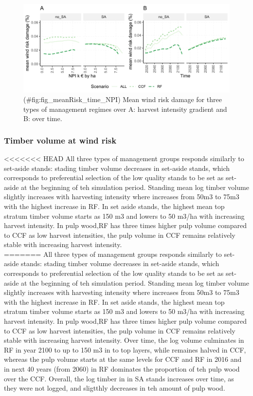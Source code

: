 \documentclass[]{elsarticle} %
\makeatletter
\def\maxwidth{\ifdim\Gin@nat@width>\linewidth\linewidth
\else\Gin@nat@width\fi}
\let\Oldincludegraphics\includegraphics
\renewcommand{\includegraphics}[1]{\Oldincludegraphics[width=\maxwidth]{#1}}
\makeatother
\begin{document}
\begin{figure}
\centering
\includegraphics{test_manus_files/figure-latex/fig_meanRisk_time_NPI-1.pdf}
\caption{(\#fig:fig\_meanRisk\_time\_NPI)\label{fig:fig_meanRisk_time_NPI} Mean wind risk damage for three types of management regimes over A: harvest intensity gradient and B: over time.}
\end{figure}

\hypertarget{timber-volume-at-wind-risk}{%
\subsubsection{Timber volume at wind risk}\label{timber-volume-at-wind-risk}}

\textless{}\textless{}\textless{}\textless{}\textless{}\textless{}\textless{} HEAD
All three types of management groups responds similarly to set-aside stands: stading timber volume decreases in set-aside stands, which corresponds to preferential selection of the low quality stands to be set as set-aside at the beginning of teh simulation period. Standing mean log timber volume slightly increases with harvesting intensity where increases from 50m3 to 75m3 with the highest increase in RF. In set aside stands, the highest mean top stratum timber volume starts as 150 m3 and lowers to 50 m3/ha with increasing harvest intensity. In pulp wood,RF has three times higher pulp volume compared to CCF as low harvest intensities, the pulp volume in CCF remains relatively stable with increasing harvest intensity.\\
=======
All three types of management groups responds similarly to set-aside stands: stading timber volume decreases in set-aside stands, which corresponds to preferential selection of the low quality stands to be set as set-aside at the beginning of teh simulation period. Standing mean log timber volume slightly increases with harvesting intensity where increases from 50m3 to 75m3 with the highest increase in RF. In set aside stands, the highest mean top stratum timber volume starts as 150 m3 and lowers to 50 m3/ha with increasing harvest intensity. In pulp wood,RF has three times higher pulp volume compared to CCF as low harvest intensities, the pulp volume in CCF remains relatively stable with increasing harvest intensity. Over time, the log volume culminates in RF in year 2100 to up to 150 m3 in to top layers, while remaines halved in CCF, whereas the pulp volume starts at the same levels for CCF and RF in 2016 and in next 40 years (from 2060) in RF dominates the proportion of teh pulp wood over the CCF. Overall, the log timber in in SA stands increases over time, as they were not logged, and sligtthly decreases in teh amount of pulp wood.
\end{document}
